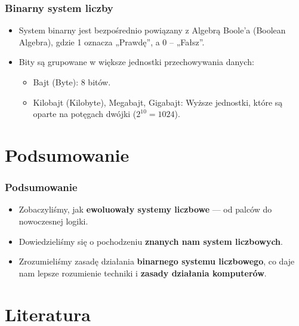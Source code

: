 \documentclass[12pt]{beamer}
\theoremstyle{plain}
\begin{document}
\begin{frame}
\frametitle{Binarny system liczby}
\begin{itemize}
\item System binarny jest bezpośrednio powiązany z Algebrą Boole’a (Boolean Algebra), gdzie 1 oznacza „Prawdę”, a 0 – „Fałsz”. \pause
\item Bity są grupowane w większe jednostki przechowywania danych:
\begin{itemize}
\item Bajt (Byte): 8 bitów.
\item Kilobajt (Kilobyte), Megabajt, Gigabajt: Wyższe jednostki, które są oparte na potęgach dwójki ($2^{10} = 1024$).
\end{itemize}
\end{itemize}
\end{frame}

\section{Podsumowanie}

\begin{frame}
\frametitle{Podsumowanie}
\centering
\vspace{0.5cm}
\begin{itemize}[<+->] %
    \item Zobaczyliśmy, jak \textbf{ewoluowały systemy liczbowe} — od palców do nowoczesnej logiki.
    \item Dowiedzieliśmy się o pochodzeniu \textbf{znanych nam system liczbowych}.
    \item Zrozumieliśmy zasadę działania \textbf{binarnego systemu liczbowego}, co daje nam lepsze rozumienie techniki i \textbf{zasady działania komputerów}.
\end{itemize}
\end{frame}

\section{Literatura}
\end{document}

